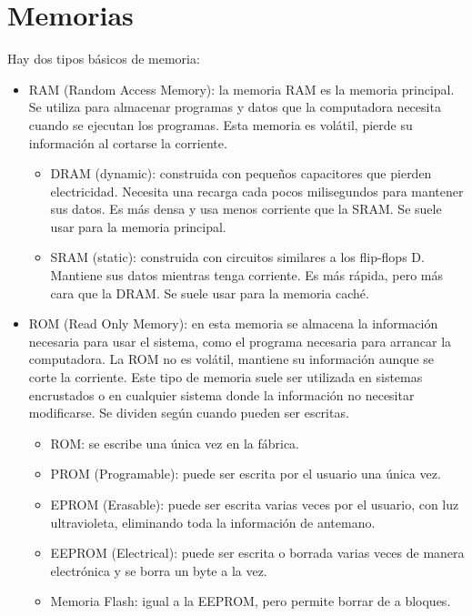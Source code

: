 \documentclass[a4paper,12pt]{article}
\begin{document}
\section{Memorias}
Hay dos tipos básicos de memoria:
\begin{itemize}
  \item RAM (Random Access Memory): la memoria RAM es la memoria principal. Se utiliza para almacenar programas
  y datos que la computadora necesita cuando se ejecutan los programas. Esta memoria es volátil, pierde su
  información al cortarse la corriente.
  \begin{itemize}
    \item DRAM (dynamic): construida con pequeños capacitores que pierden electricidad. Necesita una recarga cada
    pocos milisegundos para mantener sus datos. Es más densa y usa menos corriente que la SRAM. Se suele usar
    para la memoria principal.
    \item SRAM (static): construida con circuitos similares a los flip-flops D. Mantiene sus datos mientras tenga
    corriente. Es más rápida, pero más cara que la DRAM. Se suele usar para la memoria caché.
  \end{itemize}
  \item ROM (Read Only Memory): en esta memoria se almacena la información necesaria para usar el sistema, como
  el programa necesaria para arrancar la computadora. La ROM no es volátil, mantiene su información aunque se
  corte la corriente. Este tipo de memoria suele ser utilizada en sistemas encrustados o en cualquier sistema
  donde la información no necesitar modificarse. Se dividen según cuando pueden ser escritas.
  \begin{itemize}
    \item ROM: se escribe una única vez en la fábrica.
    \item PROM (Programable): puede ser escrita por el usuario una única vez.
    \item EPROM (Erasable): puede ser escrita varias veces por el usuario, con luz ultravioleta, eliminando toda
    la información de antemano.
    \item EEPROM (Electrical): puede ser escrita o borrada varias veces de manera electrónica y se borra un byte a la vez.
    \item Memoria Flash: igual a la EEPROM, pero permite borrar de a bloques.
  \end{itemize}
\end{itemize}
\end{document}
